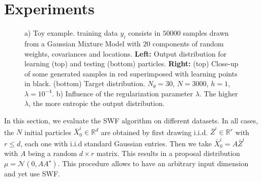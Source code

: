 
\section{Experiments}

\begin{figure}
 \hfill
{}
\caption{a) Toy example. training data $y_i$ consists in $50 000$ samples drawn from a Gaussian Mixture Model with $20$ components of random weights, covariances and locations. \textbf{Left:} Output distribution for learning (top) and testing (bottom) particles. \textbf{Right:} (top) Close-up of some generated samples in red superimposed with learning points in black. (bottom) Target distribution. $N_\theta=30$, $N=3000$, $h=1$, $\lambda=10^{-4}$. b) Influence of the regularization parameter $\lambda$. The higher $\lambda$, the more entropic the output distribution.}
\end{figure}

In this section, we evaluate the SWF algorithm on different datasets. In all cases, the $N$ initial particles $\bar{X}^i_0\in\mathbb{R}^d$ are obtained by first drawing i.i.d. $\bar{Z}^i\in\mathbb{R}^r$ with $r\leq d$, each one with i.i.d standard Gaussian entries. Then we take $\bar{X}^i_0=A\bar{Z}^i$ with $A$ being a random $d\times r$ matrix. This results in a proposal distribution $\mu=\mathcal{N}(0,AA^\star)$. This procedure allows to have an arbitrary input dimension and yet use SWF.


